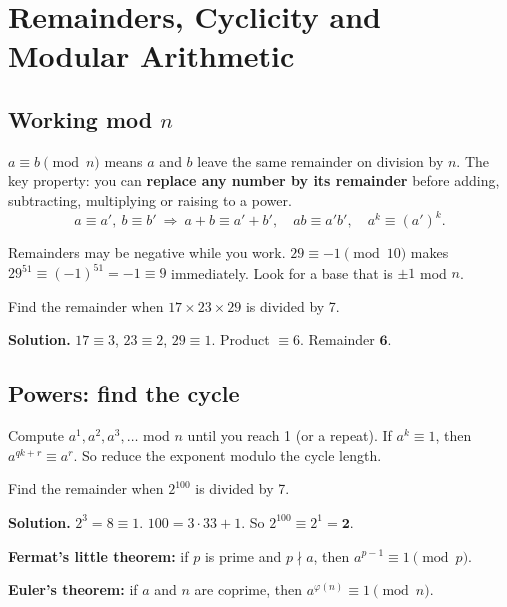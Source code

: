 \documentclass[11pt,a4paper,openany]{report}
\begin{document}
\chapter{Remainders, Cyclicity and Modular Arithmetic}\label{ch:rem}

\section{Working mod $n$}
$a\equiv b\pmod n$ means $a$ and $b$ leave the same remainder on division by $n$. The key property: you can \textbf{replace any number by its remainder} before adding, subtracting, multiplying or raising to a power.
\[a\equiv a',\ b\equiv b'\ \Rightarrow\ a+b\equiv a'+b',\quad ab\equiv a'b',\quad a^k\equiv (a')^k.\]

\begin{shortcut}
Remainders may be negative while you work. $29\equiv-1\pmod{10}$ makes $29^{51}\equiv(-1)^{51}=-1\equiv9$ immediately. Look for a base that is $\pm1$ mod $n$.
\end{shortcut}

\begin{example}
Find the remainder when $17\times23\times29$ is divided by 7.

\textbf{Solution.} $17\equiv3$, $23\equiv2$, $29\equiv1$. Product $\equiv6$. Remainder $\mathbf{6}$.
\end{example}

\section{Powers: find the cycle}
\begin{idea}[Method]
Compute $a^1, a^2, a^3,\dots$ mod $n$ until you reach 1 (or a repeat). If $a^k\equiv1$, then $a^{qk+r}\equiv a^r$. So reduce the exponent modulo the cycle length.
\end{idea}

\begin{example}
Find the remainder when $2^{100}$ is divided by 7.

\textbf{Solution.} $2^3=8\equiv1$. $100=3\cdot33+1$. So $2^{100}\equiv2^1=\mathbf{2}$.
\end{example}

\textbf{Fermat's little theorem:} if $p$ is prime and $p\nmid a$, then $a^{p-1}\equiv1\pmod p$.

\textbf{Euler's theorem:} if $a$ and $n$ are coprime, then $a^{\varphi(n)}\equiv1\pmod n$.
\end{document}
